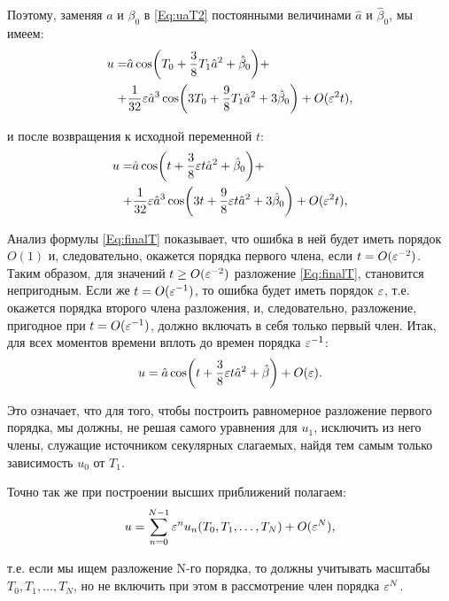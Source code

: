 Поэтому, заменяя $a$ и $\beta_0$ в \eqref{Eq:uaT2} постоянными величинами
$\hat{a}$ и $\hat{\beta}_0$, мы имеем:
\begin{align*}
    u = & \hat{a} \cos(T_0 + \frac{3}{8} T_1 \hat{a}^2 + \hat{\beta}_0) + \\
    + & \frac{1}{32} \varepsilon \hat{a}^3 \cos(3 T_0 + \frac{9}{8} T_1 \hat{a}^2 +
    3 \hat{\beta}_0 ) + O(\varepsilon^2 t),
\end{align*}

и после возвращения к исходной переменной $t$:
\begin{align}
    u = & \hat{a} \cos(t + \frac{3}{8} \varepsilon t \hat{a}^2 + \hat{\beta}_0) + \nonumber \\
    + & \frac{1}{32} \varepsilon \hat{a}^3 \cos(3 t + \frac{9}{8} \varepsilon t \hat{a}^2 +
    3 \hat{\beta}_0 ) + O(\varepsilon^2 t), \label{Eq:finalT}
\end{align}

Анализ формулы \eqref{Eq:finalT} показывает,
что ошибка в ней будет иметь порядок $O(1)$ и,
следовательно, окажется порядка первого члена,
если $t = O(\varepsilon^{-2})$. Таким образом,
для значений $t \geq O(\varepsilon^{-2})$ разложение \eqref{Eq:finalT},
становится непригодным. Если же $t = O(\varepsilon^{-1})$,
то ошибка будет иметь порядок $\varepsilon$,
т.е. окажется порядка второго члена разложения, и,
следовательно, разложение, пригодное при $t = O(\varepsilon^{-1})$,
должно включать в себя только первый член.
Итак, для всех моментов времени вплоть до времен порядка $\varepsilon^{-1}$:
\begin{equation*}
    u = \hat{a} \cos(t + \frac{3}{8} \varepsilon t \hat{a}^2 + \hat{\beta}) + O(\varepsilon). 
\end{equation*}

Это означает, что для того, чтобы построить равномерное разложение
первого порядка, мы должны, не решая самого уравнения
для $u_1$, исключить из него члены, служащие источником секулярных слагаемых,
найдя тем самым только зависимость $u_0$ от $T_1$.

Точно так же при построении высших приближений полагаем:
\begin{equation*}
    u = \sum_{n=0}^{N-1} \varepsilon^n u_n(T_0, T_1, \dots, T_N) + O(\varepsilon^N), 
\end{equation*}

т.е. если мы ищем разложение N-го порядка,
то должны учитывать масштабы $T_0, T_1, \dots, T_N$,
но не включить при этом в рассмотрение член порядка $\varepsilon^N$.


